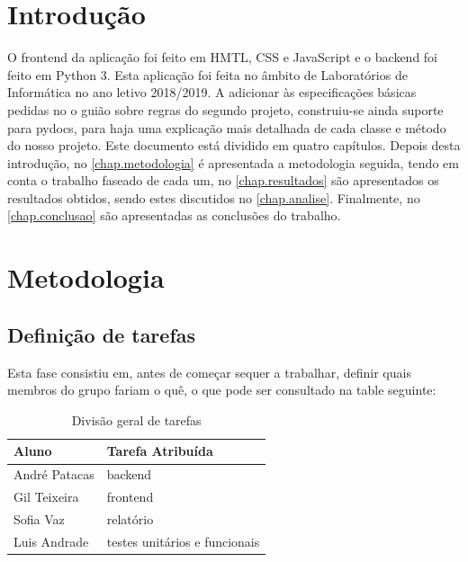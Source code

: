 \documentclass{report}
\begin{document}

\tableofcontents
 \listoftables     %
 \listoffigures    %


\clearpage
{}

\chapter{Introdução}
\label{chap.introducao}

O frontend da aplicação foi feito em HMTL, CSS e JavaScript e o backend foi feito em Python 3. Esta aplicação foi feita no âmbito de Laboratórios de Informática no ano letivo 2018/2019.
A adicionar às especificações básicas pedidas no o guião sobre regras do segundo projeto, construiu-se ainda suporte para pydocs, para haja uma explicação mais detalhada de cada classe e método do nosso projeto.
Este documento está dividido em quatro capítulos.
Depois desta introdução,
no \autoref{chap.metodologia} é apresentada a metodologia seguida, tendo em conta o trabalho faseado de cada um, 
no \autoref{chap.resultados} são apresentados os resultados obtidos,
sendo estes discutidos no \autoref{chap.analise}.
Finalmente, no \autoref{chap.conclusao} são apresentadas
as conclusões do trabalho.

\chapter{Metodologia}
\label{chap.metodologia}
\section{Definição de tarefas}
Esta fase consistiu em, antes de começar sequer a trabalhar, definir quais membros do grupo fariam o quê, o que pode ser consultado na table seguinte: 
\begin{table}[h!]
\begin{center}
\caption{Divisão geral de tarefas}
\begin{tabular}{l|l}
\hline
\multicolumn{1}{|l|}{Aluno} & \multicolumn{1}{l|}{Tarefa Atribuída} \\ \hline
            André Patacas   & backend                               \\ 
            Gil Teixeira      & frontend                               \\
            Sofia Vaz         & relatório                                \\
            Luis Andrade    & testes unitários e funcionais                     
\end{tabular}
\label{tab:table1}
\end{center}
\end{table}
\end{document}

